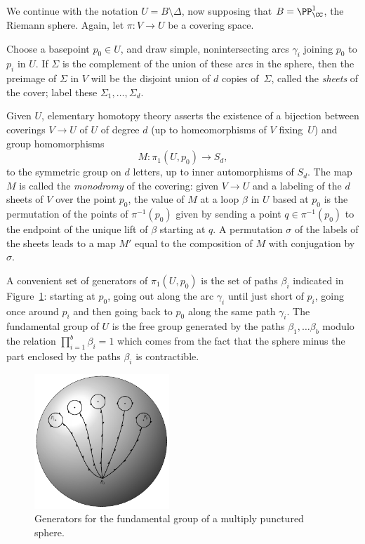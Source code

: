 We continue with the notation $U = B\setminus \Delta$, now supposing
that $B = \PP^1_\CC$, the Riemann sphere. Again, let $\pi:V\to U$ be a
covering space.

Choose a basepoint $p_0 \in U$, and draw simple, nonintersecting arcs
$\gamma_i$ joining $p_0$ to $p_i$ in $U$. If $\Sigma$ is the complement
of the union of these arcs in the sphere, then the preimage of $\Sigma$
in $V$ will be the disjoint union of $d$ copies of~$\Sigma$, called the
%
\emph{sheets} of the cover; label these $\Sigma_1,\dots,\Sigma_d$.

Given $U$, elementary homotopy theory asserts the existence of a bijection
between coverings $V \to U$ of $U$ of degree $d$ (up to homeomorphisms
of $V$ fixing~$U$) and group
homomorphisms
   $$
 M:  \pi_1(U, p_0) \to S_d,
   $$
to the symmetric group on $d$ letters, up to inner automorphisms of
%
%
$S_{d}$. The map $M$ is called the \emph{monodromy} of the covering:
given $V \to U$
and a labeling of the $d$ sheets of $V$ over the point
$p_0$, the value of $M$ at a loop  $\beta$ in $U$ based at $p_0$ 
is the
permutation of the points of $\pi^{-1}(p_0)$ given by sending a point
$q \in \pi^{-1}(p_0)$ to the endpoint of the unique lift of $\beta$
starting at $q$. A permutation $\sigma$ of the labels  of the sheets
leads to a map $M'$ equal to the composition of $M$ with conjugation
by $\sigma$.

A convenient set of generators of $ \pi_1(U, p_0)$ is the set of paths
$\beta_i$ indicated in Figure~\ref{pi 1 generators}: starting at $p_0$,
going out along the arc $\gamma_i$ until just short of $p_i$, going
once around $p_i$ and then going back to $p_0$ along the same path
$\gamma_i$. The fundamental group
%
%
 of $U$ is the free group generated
by the paths $\beta_1,\dots \beta_b$ \null modulo the relation $\prod_{i=1}^b
\beta_i = 1$
which comes from the fact that the sphere minus the part enclosed by
the paths $\beta_i$ is
contractible.
{\meshing\par}

\begin{figure}
\centerline{\includegraphics[height=2in]{main/Fig05-1}}
 \caption{Generators for the fundamental group of a multiply punctured
 sphere.}
 \label{pi 1 generators}
\end{figure}

